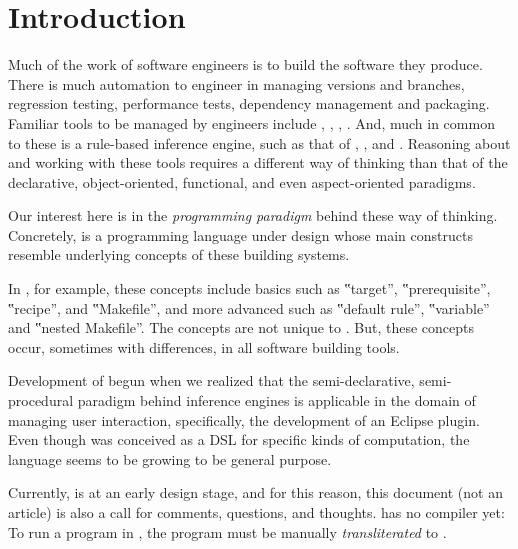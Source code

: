 \section{Introduction}

Much of the work of software engineers is to build the software they produce.
There is much automation to engineer in managing versions and branches,
regression testing, performance tests, dependency management and packaging.
Familiar tools to be managed by engineers include
,
,
, . And,
much in common to these is a rule-based inference engine, such as that of
, , and
. Reasoning about and working with these
tools requires a different way of thinking than that of the declarative,
object-oriented, functional, and even aspect-oriented paradigms.

Our interest here is in the \emph{programming paradigm} behind these way of
thinking. Concretely, \Reap is a programming language under design whose main
constructs resemble underlying concepts of these building systems.

In , for example, these concepts include basics such as ‟target”,
‟prerequisite”, ‟recipe”, and ‟Makefile”, and more advanced such as ‟default
rule”, ‟variable” and ‟nested Makefile”. The concepts are not unique to
. But, these concepts occur, sometimes with differences, in all
software building tools.

Development of \Reap begun when we realized that the semi-declarative,
semi-procedural paradigm behind inference engines is applicable in the domain
of managing user interaction, specifically, the development of an Eclipse
plugin. Even though \Reap was conceived as a DSL for specific kinds of
computation, the language seems to be growing to be general purpose. 


Currently, \Reap is at an early design stage, and for this reason, this
document (not an article) is also a call for comments, questions, and thoughts.
\Reap has no compiler yet: To run a program in \Reap, the program must be
manually \emph{transliterated} to \Java.

